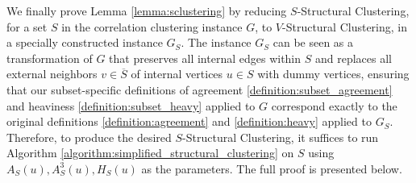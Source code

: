 \documentclass{article}
\begin{document}
We finally prove Lemma \ref{lemma:sclustering} by reducing $S$-Structural Clustering, for a set $S$ in the correlation clustering instance $G$, to $V$-Structural Clustering, in a specially constructed instance $G_S$. The instance $G_S$ can be seen as a transformation of $G$ that preserves all internal edges within $S$ and replaces all external neighbors $v \in \overline{S}$ of internal vertices $u \in S$ with dummy vertices, ensuring that our subset-specific definitions of agreement \ref{definition:subset_agreement} and heaviness \ref{definition:subset_heavy} applied to $G$ correspond exactly to the original definitions \ref{definition:agreement} and \ref{definition:heavy} applied to $G_S$. Therefore, to produce the desired $S$-Structural Clustering, it suffices to run Algorithm \ref{algorithm:simplified_structural_clustering} on $S$ using $A_S(u), A_S^3(u), H_S(u)$ as the parameters. The full proof is presented below.
\end{document}
